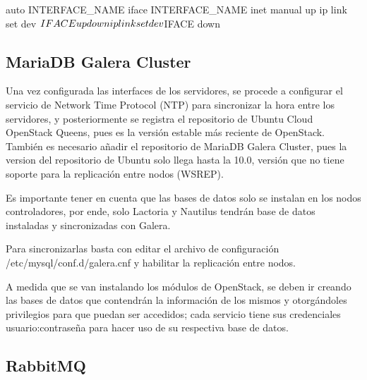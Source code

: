     auto INTERFACE\_NAME \newline
    iface  INTERFACE\_NAME inet manual\newline
    up ip link set dev $IFACE up\newline
    down ip link set dev $IFACE down
    
    
    
    \subsection{MariaDB Galera Cluster}
    
    Una vez configurada las interfaces de los servidores, se procede a configurar el servicio de Network Time Protocol (NTP) para sincronizar la hora entre los servidores, y posteriormente se registra el repositorio de Ubuntu Cloud OpenStack Queens, pues es la versión estable más reciente de OpenStack. También es necesario añadir el repositorio de MariaDB Galera Cluster, pues la version del repositorio de Ubuntu solo llega hasta la 10.0, versión que no tiene soporte para la replicación entre nodos (WSREP).
    
   	Es importante tener en cuenta que las bases de datos solo se instalan en los nodos controladores, por ende, solo Lactoria y Nautilus tendrán base de datos instaladas y sincronizadas con Galera.
    
    Para sincronizarlas basta con editar el archivo de configuración /etc/mysql/conf.d/galera.cnf y habilitar la replicación entre nodos.
   
   
   A medida que se van instalando los módulos de OpenStack, se deben ir creando las bases de datos que contendrán la información de los mismos y otorgándoles privilegios para que puedan ser accedidos; cada servicio tiene sus credenciales usuario:contraseña para hacer uso de su respectiva base de datos.
   
    
    \subsection{RabbitMQ}
    
